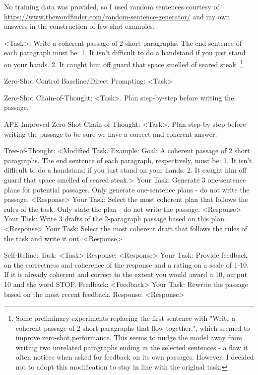 \documentclass[11pt]{article}
\begin{document}
No training data was provided, so I used random sentences courtesy of \url{https://www.thewordfinder.com/random-sentence-generator/} and my own answers in the construction of few-shot examples.

<Task>:
Write a coherent passage of 2 short paragraphs. The end sentence of each paragraph must be: 1. It isn't difficult to do a handstand if you just stand on your hands. 2. It caught him off guard that space smelled of seared steak. \footnote{Some preliminary experiments replacing the first sentence with "Write a coherent passage of 2 short paragraphs that flow together.", which seemed to improve zero-shot performance. This seems to nudge the model away from writing two unrelated paragraphs ending in the selected sentences - a flaw it often notices when asked for feedback on its own passages. However, I decided not to adopt this modification to stay in line with the original task.}

Zero-Shot Control Baseline/Direct Prompting:
<Task>

Zero-Shot Chain-of-Thought:
<Task>. Plan step-by-step before writing the passage.

APE Improved Zero-Shot Chain-of-Thought:
<Task>. Plan step-by-step before writing the passage to be sure we have a correct and coherent answer.

Tree-of-Thought:
<Modified Task. Example: Goal: A coherent passage of 2 short paragraphs. The end sentence of each paragraph, respectively, must be: 1. It isn't difficult to do a handstand if you just stand on your hands. 2. It caught him off guard that space smelled of seared steak.>
Your Task: Generate 3 one-sentence plans for potential passages. Only generate one-sentence plans - do not write the passage.
<Response>
Your Task: Select the most coherent plan that follows the rules of the task. Only state the plan - do not write the passage.
<Response>
Your Task: Write 3 drafts of the 2-paragraph passage based on this plan.
<Response>
Your Task: Select the most coherent draft that follows the rules of the task and write it out.
<Response>

Self-Refine: 
Task: <Task>
Response: <Response>
Your Task: Provide feedback on the correctness and coherence of the response and a rating on a scale of 1-10. If it is already coherent and correct to the extent you would award a 10, output 10 and the word STOP.
Feedback: <Feedback>
Your Task: Rewrite the passage based on the most recent feedback.
Response: <Response>
\end{document}
